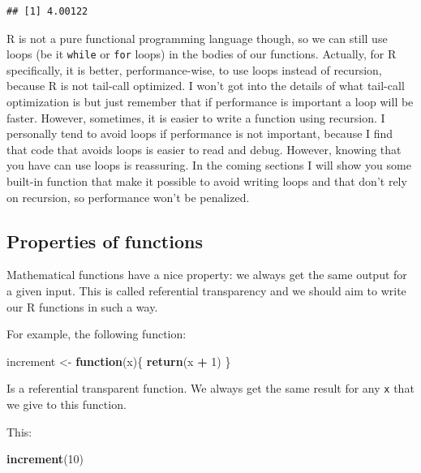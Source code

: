 \documentclass[]{gitbook}
\newenvironment{Shaded}{\begin{snugshade}}{\end{snugshade}}
\newcommand{\ControlFlowTok}[1]{\textcolor[rgb]{0.13,0.29,0.53}{\textbf{#1}}}
\newcommand{\DecValTok}[1]{\textcolor[rgb]{0.00,0.00,0.81}{#1}}
\newcommand{\KeywordTok}[1]{\textcolor[rgb]{0.13,0.29,0.53}{\textbf{#1}}}
\newcommand{\NormalTok}[1]{#1}
\newcommand{\OperatorTok}[1]{\textcolor[rgb]{0.81,0.36,0.00}{\textbf{#1}}}
\newcommand{\StringTok}[1]{\textcolor[rgb]{0.31,0.60,0.02}{#1}}
\theoremstyle{definition}
\theoremstyle{definition}
\theoremstyle{definition}
\theoremstyle{remark}
\begin{document}
\begin{verbatim}
## [1] 4.00122
\end{verbatim}

R is not a pure functional programming language though, so we can still
use loops (be it \texttt{while} or \texttt{for} loops) in the bodies of
our functions. Actually, for R specifically, it is better,
performance-wise, to use loops instead of recursion, because R is not
tail-call optimized. I won't got into the details of what tail-call
optimization is but just remember that if performance is important a
loop will be faster. However, sometimes, it is easier to write a
function using recursion. I personally tend to avoid loops if
performance is not important, because I find that code that avoids loops
is easier to read and debug. However, knowing that you have can use
loops is reassuring. In the coming sections I will show you some
built-in function that make it possible to avoid writing loops and that
don't rely on recursion, so performance won't be penalized.

\hypertarget{properties-of-functions}{%
\subsection{Properties of functions}\label{properties-of-functions}}

Mathematical functions have a nice property: we always get the same
output for a given input. This is called referential transparency and we
should aim to write our R functions in such a way.

For example, the following function:

\begin{Shaded}
\begin{Highlighting}[]
\NormalTok{increment <-}\StringTok{ }\ControlFlowTok{function}\NormalTok{(x)\{}
    \KeywordTok{return}\NormalTok{(x }\OperatorTok{+}\StringTok{ }\DecValTok{1}\NormalTok{)}
\NormalTok{\}}
\end{Highlighting}
\end{Shaded}

Is a referential transparent function. We always get the same result for
any \texttt{x} that we give to this function.

This:

\begin{Shaded}
\begin{Highlighting}[]
\KeywordTok{increment}\NormalTok{(}\DecValTok{10}\NormalTok{)}
\end{Highlighting}
\end{Shaded}
\end{document}
